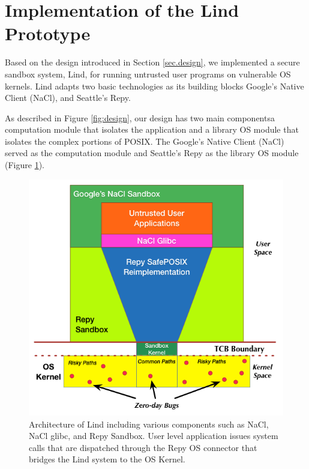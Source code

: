 \section{Implementation of the Lind Prototype}
\label{sec.implementation}

Based on the design introduced in Section \ref{sec.design},
we implemented a secure sandbox system, Lind,
for running untrusted user programs on vulnerable OS kernels.
Lind adapts two basic technologies as its building blocks\textendash
Google's Native Client (NaCl), and Seattle's Repy.

As described in Figure \ref{fig:design}, our design has
two main components\textendash a computation module that isolates the
application and a library OS module that isolates the complex
portions of POSIX.
The Google's Native Client (NaCl) ~\cite{NaCl-09} served as the computation
module and Seattle's Repy as the library OS module (Figure \ref{fig:architecture}).

\begin{figure}%
\centering
	\includegraphics[width=1.0\columnwidth]{diagram/lind_architecture_new.png}
	\caption{Architecture of Lind including various components such as NaCl, NaCl glibc, and Repy Sandbox.
	User level application issues system calls that are dispatched through the Repy OS connector that bridges the Lind system to the OS Kernel.}

\label{fig:architecture}
\end{figure}

